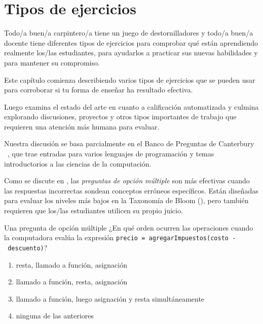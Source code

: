 \chapter{Tipos de ejercicios}\label{s:exercises}

Todo/a buen/a carpintero/a tiene un juego de destornilladores y todo/a buen/a docente tiene diferentes tipos de ejercicios para comprobar qué están aprendiendo realmente los/las estudiantes, para ayudarlos a practicar sus nuevas habilidades y para mantener su compromiso.

Este capítulo comienza describiendo varios tipos de ejercicios que se pueden usar para corroborar si tu forma de enseñar ha resultado efectiva.

Luego examina el estado del arte en cuanto a calificación automatizada y culmina explorando discusiones, proyectos y otros tipos importantes de trabajo que requieren una atención más humana para evaluar.

Nuestra discusión se basa parcialmente en el Banco de Preguntas de Canterbury ~\cite{Sand2013}, que trae entradas para varios lenguajes de programación y temas introductorios a las ciencias de la computación.


Como se discute en , las \emph{preguntas de opción múltiple} son más efectivas cuando las respuestas incorrectas sondean conceptos erróneos específicos.  
Están diseñadas para evaluar los niveles más bajos en la Taxonomía de Bloom 
(), pero también requieren que los/las estudiantes utilicen su propio juicio.

\begin{aside}{Una pregunta de opción múltiple}
  ¿En qué orden ocurren las operaciones cuando la computadora evalúa la expresión \texttt{precio\ =\ agregarImpuestos(costo\ -\ descuento)}?
  \begin{enumerate}
  \item
    resta, llamado a función, asignación
  \item
    llamado a función, resta, asignación
  \item
    llamado a función, luego asignación y resta simultáneamente
  \item
    ninguna de las anteriores
  \end{enumerate}
\end{aside}


